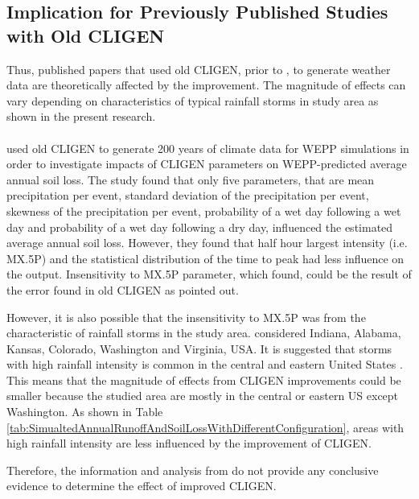 \subsection{Implication for Previously Published Studies with Old CLIGEN}

Thus, published papers that used old CLIGEN, prior to \citet{yu2000-301}, to
generate
weather data are theoretically affected by the improvement. The magnitude
of effects can vary depending on characteristics of typical rainfall storms in
study area as shown in the present research.

\paragraph{\citet{baffaut1996-447}} used old CLIGEN to generate 200 years of
climate data for WEPP simulations in order to investigate impacts of CLIGEN
parameters on WEPP-predicted average annual soil loss. The study found that only
five parameters, that are mean precipitation per event, standard deviation of
the precipitation per event, skewness of the precipitation per event,
probability of a wet day following a wet day and probability of a wet day
following a dry day, influenced the estimated average annual soil loss. However,
they found that half hour largest intensity (i.e. {MX.5P}) and the statistical
distribution of the time to peak had less influence on the output. Insensitivity
to {MX.5P} parameter, which \citet{baffaut1996-447} found, could be the result
of the error found in old CLIGEN as \citet{yu2000-301} pointed out.

However, it is also possible that the insensitivity to {MX.5P} was from
the characteristic of rainfall storms in the study area. \citet{baffaut1996-447}
considered Indiana, Alabama, Kansas, Colorado, Washington and Virginia, USA. It
is suggested that storms with high rainfall intensity is common in the central
and eastern United States \citep{ashley2003-3003}. This means that the magnitude
of effects from CLIGEN improvements could be smaller because the studied
area are mostly in the central or eastern US except Washington. As shown in
Table \ref{tab:SimualtedAnnualRunoffAndSoilLossWithDifferentConfiguration},
areas with high rainfall intensity are less influenced by the improvement of
CLIGEN.

Therefore, the information and analysis from \citet{baffaut1996-447} do not
provide any conclusive evidence to determine the effect of improved CLIGEN.

